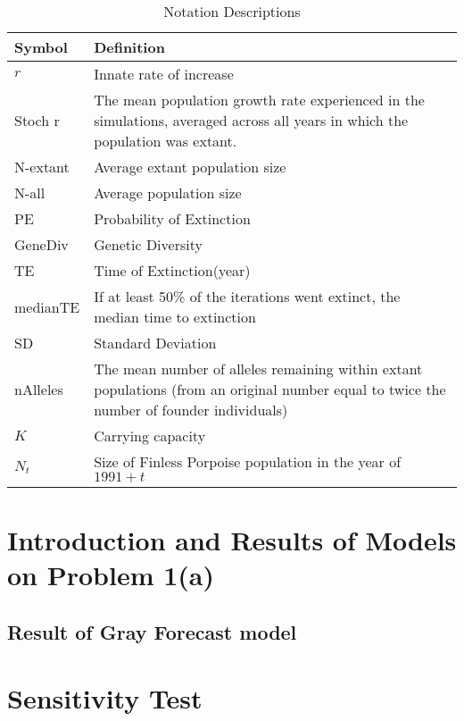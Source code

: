\documentclass{mcmthesis}
\numberwithin{figure}{section}
\numberwithin{table}{section}
\numberwithin{equation}{section}
\begin{document}
\renewcommand\arraystretch{1.5}

\begin{table}[htpb!]
  \centering
  \caption{Notation Descriptions\citep{Vortex}} \label{Vortex_out}
  \begin{tabular}{m{2.5cm}<{\centering}|m{12.5cm}<{\centering}}
  \toprule[1.5pt]
  \textbf{Symbol} & \textbf{Definition} \\ \hline
  $ r $ & Innate rate of increase \\
  Stoch r & The mean population growth rate experienced in the simulations, averaged 
  across all years in which the population was extant. \\
  N-extant  & Average extant population size\\ 
  N-all  & Average population size \\
  PE  & Probability of Extinction \\
  GeneDiv  &  Genetic Diversity \\
  TE & Time of Extinction(year) \\
  medianTE & If at least 50\% of the iterations went extinct, 
  the median time to extinction \\
  SD & Standard Deviation \\
  nAlleles & The mean number of alleles remaining within extant populations 
  (from an original number equal to twice the number of founder individuals)\\
  $ K $ & Carrying capacity \\ 
  $ N_t $ & Size of Finless Porpoise population in the year of $ 1991 + t $ \\ 
  \bottomrule[1.5pt]
  \end{tabular}
  \end{table}



\section{Introduction and Results of Models on Problem 1(a)}


\subsection{Result of Gray Forecast model}


\section{Sensitivity Test}
\end{document}
